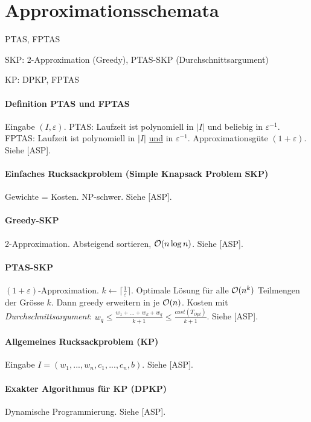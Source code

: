 \section{Approximationsschemata}

\begin{takeaway}
    \item PTAS, FPTAS
    \item SKP: 2-Approximation (Greedy), PTAS-SKP (Durchschnittsargument)
    \item KP: DPKP, FPTAS
\end{takeaway}

\paragraph{Definition PTAS und FPTAS}
Eingabe $(I, \varepsilon)$.
PTAS: Laufzeit ist polynomiell in $|I|$ und beliebig in $\varepsilon^{-1}$.
FPTAS: Laufzeit ist polynomiell in $|I|$ \underline{und} in $\varepsilon^{-1}$.
Approximationsgüte $(1+\varepsilon)$.
Siehe [ASP].

\paragraph{Einfaches Rucksackproblem (Simple Knapsack Problem SKP)}
Gewichte = Kosten. NP-schwer.
Siehe [ASP].

\paragraph{Greedy-SKP}
2-Approximation. Absteigend sortieren, $\mathcal{O}(n \log n)$.
Siehe [ASP].

\paragraph{PTAS-SKP}
$(1+\varepsilon)$-Approximation.
$k \gets \lceil \frac{1}{\varepsilon} \rceil$.
Optimale Lösung für alle $\mathcal{O}(n^k)$ Teilmengen der Grösse $k$. Dann greedy erweitern in je $\mathcal{O}(n)$.
Kosten mit \emph{Durchschnittsargument}: $w_q \leq \frac{w_1 + ... + w_k + w_q}{k+1} \leq \frac{cost(T_{Opt})}{k+1}$.
Siehe [ASP].

\paragraph{Allgemeines Rucksackproblem (KP)}
Eingabe $I = (w_1, ..., w_n, c_1, ..., c_n, b)$.
Siehe [ASP].

\paragraph{Exakter Algorithmus für KP (DPKP)}
Dynamische Programmierung. Siehe [ASP].

